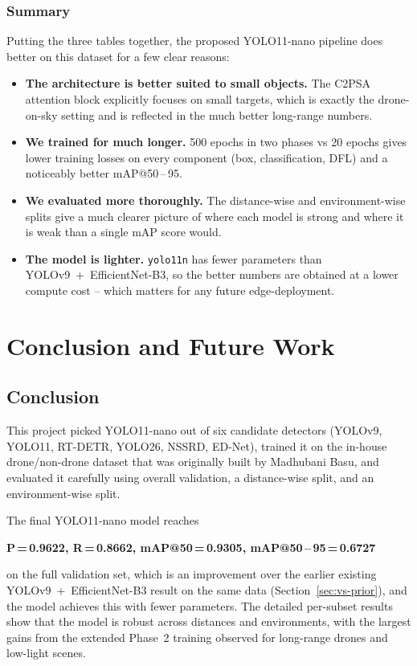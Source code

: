 \documentclass[12pt,a4paper]{report}
\begin{document}
\subsection{Summary}
Putting the three tables together, the proposed YOLO11-nano pipeline does
better on this dataset for a few clear reasons:
\begin{itemize}[noitemsep]
    \item \textbf{The architecture is better suited to small objects.} The
          C2PSA attention block explicitly focuses on small targets, which
          is exactly the drone-on-sky setting and is reflected in the much
          better long-range numbers.
    \item \textbf{We trained for much longer.} 500 epochs in two phases vs
          20 epochs gives lower training losses on every component (box,
          classification, DFL) and a noticeably better mAP@50\,--\,95.
    \item \textbf{We evaluated more thoroughly.} The distance-wise and
          environment-wise splits give a much clearer picture of where each
          model is strong and where it is weak than a single mAP score
          would.
    \item \textbf{The model is lighter.} \texttt{yolo11n} has fewer
          parameters than YOLOv9~+~EfficientNet-B3, so the better numbers
          are obtained at a lower compute cost -- which matters for any
          future edge-deployment.
\end{itemize}

\chapter{Conclusion and Future Work}
\label{ch:conclusion}

\section{Conclusion}
This project picked YOLO11-nano out of six candidate detectors (YOLOv9, YOLO11,
RT-DETR, YOLO26, NSSRD, ED-Net), trained it on the in-house drone/non-drone
dataset that was originally built by Madhubani Basu, and evaluated it carefully
using overall validation, a distance-wise split, and an environment-wise split.

The final YOLO11-nano model reaches
\begin{center}
\textbf{P\,=\,0.9622, \; R\,=\,0.8662, \; mAP@50\,=\,0.9305,
\; mAP@50\,--\,95\,=\,0.6727}
\end{center}
on the full validation set, which is an improvement over the earlier existing
YOLOv9~+~EfficientNet-B3 result on the same data
(Section~\ref{sec:vs-prior}), and the model achieves this with fewer
parameters. The detailed per-subset results show that the model is robust
across distances and environments, with the largest gains from the extended
Phase~2 training observed for long-range drones and low-light scenes.
\end{document}
